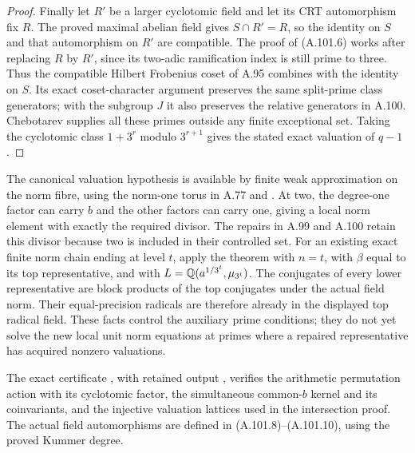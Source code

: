 \begin{proof}
Finally let $R'$ be a larger cyclotomic field and
let its CRT automorphism fix $R$.
The proved maximal abelian field gives $S\cap R'=R$,
so the identity on $S$ and that automorphism on $R'$
are compatible.
The proof of (A.101.6) works after replacing $R$
by $R'$, since its two-adic ramification index
is still prime to three.
Thus the compatible Hilbert Frobenius coset of
A.95 combines with the identity on $S$.
Its exact coset-character argument preserves the
same split-prime class generators; with the subgroup
$J$ it also preserves the relative generators
in A.100.
Chebotarev supplies all these primes outside any
finite exceptional set.
Taking the cyclotomic class $1+3^r$ modulo
$3^{r+1}$ gives the stated exact valuation of $q-1$.
\end{proof}

The canonical valuation hypothesis is available by
finite weak approximation on the norm fibre, using
the norm-one torus in A.77 and
\cite[Theorems 1.2, 2.2 and 3.2]{RootHoshiYamasaki2025}.
At two, the degree-one factor can carry $b$ and
the other factors can carry one, giving a local
norm element with exactly the required divisor.
The repairs in A.99 and A.100 retain this divisor
because two is included in their controlled set.
For an existing exact finite norm chain ending at level $t$,
apply the theorem with $n=t$, with $\beta$ equal to its
top representative, and with
$L=\mathbb Q(a^{1/3^t},\mu_{3^t})$.
The conjugates of every lower representative are block
products of the top conjugates under the actual
field norm.  Their equal-precision radicals are
therefore already in the displayed top radical
field.  These facts control the auxiliary prime
conditions; they do not yet solve the new local
unit norm equations at primes where a repaired
representative has acquired nonzero valuations.

\noindent The exact certificate
, with retained output
, verifies
the arithmetic permutation action with its cyclotomic factor,
the simultaneous common-$b$ kernel and its coinvariants,
and the injective valuation lattices used in the intersection
proof.  The actual field automorphisms are defined in
(A.101.8)--(A.101.10), using the proved Kummer degree.
